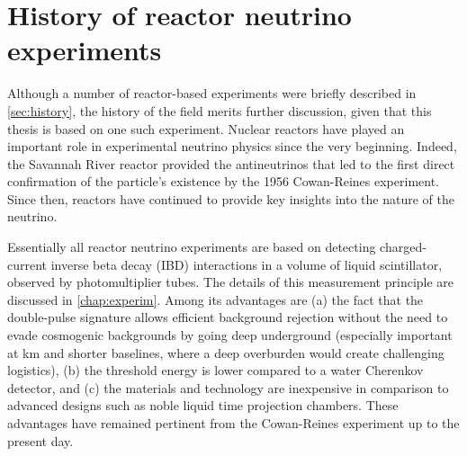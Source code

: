 \documentclass[../thesis.tex]{subfiles}
\begin{document}
\section{History of reactor neutrino experiments}
\label{sec:introReactor}

Although a number of reactor-based experiments were briefly described in \ref{sec:history}, the history of the field merits further discussion, given that this thesis is based on one such experiment. Nuclear reactors have played an important role in experimental neutrino physics since the very beginning. Indeed, the Savannah River reactor provided the antineutrinos that led to the first direct confirmation of the particle's existence by the 1956 Cowan-Reines experiment. Since then, reactors have continued to provide key insights into the nature of the neutrino.

Essentially all reactor neutrino experiments are based on detecting charged-current inverse beta decay (IBD) interactions in a volume of liquid scintillator, observed by photomultiplier tubes. The details of this measurement principle are discussed in \autoref{chap:experim}. Among its advantages are (a) the fact that the double-pulse signature allows efficient background rejection without the need to evade cosmogenic backgrounds by going deep underground (especially important at km and shorter baselines, where a deep overburden would create challenging logistics), (b) the threshold energy is lower compared to a water Cherenkov detector, and (c) the materials and technology are inexpensive in comparison to advanced designs such as noble liquid time projection chambers. These advantages have remained pertinent from the Cowan-Reines experiment up to the present day.
\end{document}
